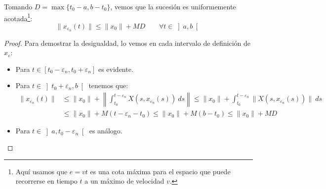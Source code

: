 \noindent
Tomando $D = \max\{t_0-a, b-t_0\}$, vemos que la sucesión es uniformemente acotada\footnote{Aquí usamos que $e=vt$ es una cota máxima para el espacio que puede recorrerse en tiempo $t$ a un máximo de velocidad $v$.}:
\begin{equation*}
    \|x_{\varepsilon_n}(t)\| \leq \|x_0\| + MD \qquad \forall t\in \left]a,b\right[
\end{equation*}
\begin{proof}
    Para demostrar la desigualdad, lo vemos en cada intervalo de definición de $x_{\varepsilon}$:
    \begin{itemize}
        \item Para $t\in [t_0-\varepsilon_n,t_0+\varepsilon_n]$ es evidente.
        \item Para $t\in \left]t_0+\varepsilon_n,b\right[$ tenemos que:
            \begin{align*}
                \|x_{\varepsilon_n}(t)\|&\leq \|x_0\| + \left\|\int_{t_0}^{t-\varepsilon_n} X(s,x_{\varepsilon_n}(s))~ds \right\| \leq \|x_0\| + \int_{t_0}^{t-\varepsilon_n} \|X(s,x_{\varepsilon_n}(s))\|~ds  \\
                                      &\leq \|x_0\| + M(t-\varepsilon_n-t_0) \leq \|x_0\| + M(b-t_0) \leq \|x_0\| + MD
            \end{align*}
        \item Para $t\in \left]a,t_0-\varepsilon_n\right[$ es análogo.
    \end{itemize}
\end{proof}

